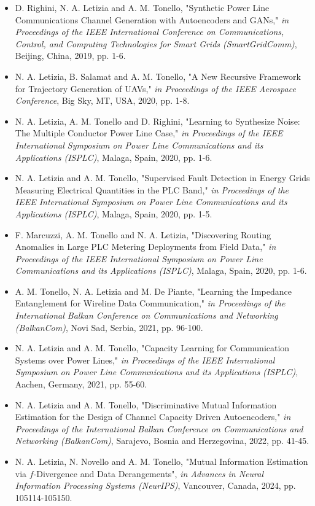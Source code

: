 \begin{itemize}
\item D. Righini, N. A. Letizia and A. M. Tonello, "Synthetic Power Line Communications Channel Generation with Autoencoders and GANs," \textit{in Proceedings of the IEEE International Conference on Communications, Control, and Computing Technologies for Smart Grids (SmartGridComm)}, Beijing, China, 2019, pp. 1-6.
\item N. A. Letizia, B. Salamat and A. M. Tonello, "A New Recursive Framework for Trajectory Generation of UAVs," \textit{in Proceedings of the IEEE Aerospace Conference}, Big Sky, MT, USA, 2020, pp. 1-8.
\item N. A. Letizia, A. M. Tonello and D. Righini, "Learning to Synthesize Noise: The Multiple Conductor Power Line Case," \textit{in Proceedings of the IEEE International Symposium on Power Line Communications and its Applications (ISPLC)}, Malaga, Spain, 2020, pp. 1-6.
\item N. A. Letizia and A. M. Tonello, "Supervised Fault Detection in Energy Grids Measuring Electrical Quantities in the PLC Band," \textit{in Proceedings of the IEEE International Symposium on Power Line Communications and its Applications (ISPLC)}, Malaga, Spain, 2020, pp. 1-5.
\item F. Marcuzzi, A. M. Tonello and N. A. Letizia, "Discovering Routing Anomalies in Large PLC Metering Deployments from Field Data," \textit{in Proceedings of the IEEE International Symposium on Power Line Communications and its Applications (ISPLC)}, Malaga, Spain, 2020, pp. 1-6.
\item A. M. Tonello, N. A. Letizia and M. De Piante, "Learning the Impedance Entanglement for Wireline Data Communication," \textit{in Proceedings of the International Balkan Conference on Communications and Networking (BalkanCom)}, Novi Sad, Serbia, 2021, pp. 96-100. 
\item N. A. Letizia and A. M. Tonello, "Capacity Learning for Communication Systems over Power Lines," \textit{in Proceedings of the IEEE International Symposium on Power Line Communications and its Applications (ISPLC)}, Aachen, Germany, 2021, pp. 55-60.
\item N. A. Letizia and A. M. Tonello, "Discriminative Mutual Information Estimation for the Design of Channel Capacity Driven Autoencoders," \textit{in Proceedings of the International Balkan Conference on Communications and Networking (BalkanCom)}, Sarajevo, Bosnia and Herzegovina, 2022, pp. 41-45.
\item N. A. Letizia, N. Novello and A. M. Tonello, "Mutual Information Estimation via $f$-Divergence and Data Derangements", \textit{in Advances in Neural Information Processing Systems (NeurIPS)}, Vancouver, Canada, 2024, pp. 105114-105150.
\end{itemize}